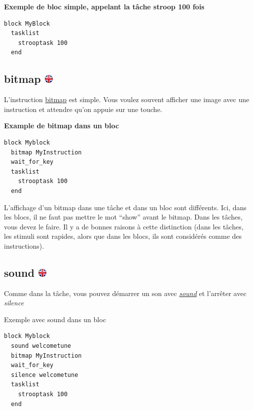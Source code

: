 \documentclass[
]{book}
\begin{document}
\textbf{Exemple de bloc simple, appelant la tâche stroop 100 fois}

\begin{verbatim}
block MyBlock
  tasklist
    strooptask 100
  end
\end{verbatim}

\hypertarget{bitmap}{%
\subsection[bitmap ]{\texorpdfstring{bitmap \href{https://www.psytoolkit.org/doc3.4.0/syntax.html\#block-bitmap}{\protect\includegraphics{img/ukflag.png}}}{bitmap }}\label{bitmap}}

L'instruction \protect\hyperlink{bitmap}{bitmap} est simple. Vous voulez souvent afficher une image avec une instruction et attendre qu'on appuie sur une touche.

\textbf{Example de bitmap dans un bloc}

\begin{verbatim}
block Myblock
  bitmap MyInstruction
  wait_for_key
  tasklist
    strooptask 100
  end
\end{verbatim}

L'affichage d'un bitmap dans une tâche et dans un bloc sont différents. Ici, dans les blocs, il ne faut pas mettre le mot ``show'' avant le bitmap. Dans les tâches, vous devez le faire. Il y a de bonnes raisons à cette distinction (dans les tâches, les stimuli sont rapides, alors que dans les blocs, ils sont considérés comme des instructions).

\hypertarget{sound-1}{%
\subsection[sound ]{\texorpdfstring{sound \href{https://www.psytoolkit.org/doc3.4.0/syntax.html\#block-sound}{\protect\includegraphics{img/ukflag.png}}}{sound }}\label{sound-1}}

Comme dans la tâche, vous pouvez démarrer un son avec \emph{\protect\hyperlink{sound}{sound}} et l'arrêter avec \emph{silence}

Exemple avec sound dans un bloc

\begin{verbatim}
block Myblock
  sound welcometune
  bitmap MyInstruction
  wait_for_key
  silence welcometune
  tasklist
    strooptask 100
  end
\end{verbatim}
\end{document}
